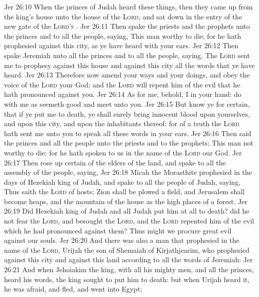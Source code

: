 \vs Jer 26:10 When the princes of Judah heard these things, then they came up from the king's house unto the house of the \textsc{Lord}, and sat down in the entry of the new gate of the \textsc{Lord's} .
\vs Jer 26:11 Then spake the priests and the prophets unto the princes and to all the people, saying, This man  worthy to die; for he hath prophesied against this city, as ye have heard with your ears.
\vs Jer 26:12 Then spake Jeremiah unto all the princes and to all the people, saying, The \textsc{Lord} sent me to prophesy against this house and against this city all the words that ye have heard.
\vs Jer 26:13 Therefore now amend your ways and your doings, and obey the voice of the \textsc{Lord} your God; and the \textsc{Lord} will repent him of the evil that he hath pronounced against you.
\vs Jer 26:14 As for me, behold, I  in your hand: do with me as seemeth good and meet unto you.
\vs Jer 26:15 But know ye for certain, that if ye put me to death, ye shall surely bring innocent blood upon yourselves, and upon this city, and upon the inhabitants thereof: for of a truth the \textsc{Lord} hath sent me unto you to speak all these words in your ears.
\vs Jer 26:16 Then said the princes and all the people unto the priests and to the prophets; This man  not worthy to die: for he hath spoken to us in the name of the \textsc{Lord} our God.
\vs Jer 26:17 Then rose up certain of the elders of the land, and spake to all the assembly of the people, saying,
\vs Jer 26:18 Micah the Morasthite prophesied in the days of Hezekiah king of Judah, and spake to all the people of Judah, saying, Thus saith the \textsc{Lord} of hosts; Zion shall be plowed  a field, and Jerusalem shall become heaps, and the mountain of the house as the high places of a forest.
\vs Jer 26:19 Did Hezekiah king of Judah and all Judah put him at all to death? did he not fear the \textsc{Lord}, and besought the \textsc{Lord}, and the \textsc{Lord} repented him of the evil which he had pronounced against them? Thus might we procure great evil against our souls.
\vs Jer 26:20 And there was also a man that prophesied in the name of the \textsc{Lord}, Urijah the son of Shemaiah of Kirjathjearim, who prophesied against this city and against this land according to all the words of Jeremiah:
\vs Jer 26:21 And when Jehoiakim the king, with all his mighty men, and all the princes, heard his words, the king sought to put him to death: but when Urijah heard it, he was afraid, and fled, and went into Egypt;
